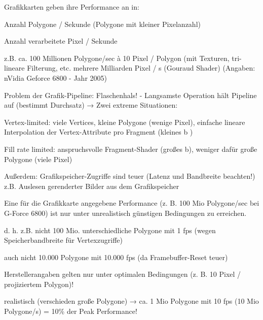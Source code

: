 \documentclass[landscape]{article}
\begin{document}
\begin{multicols}{3}
  \begin{itemize*}
    \item Grafikkarten geben ihre Performance an in:
          \begin{itemize*}
            \item  Anzahl Polygone / Sekunde (Polygone mit kleiner Pixelanzahl)
            \item Anzahl verarbeitete Pixel / Sekunde
            \item  z.B. ca. 100 Millionen Polygone/sec à 10 Pixel / Polygon (mit Texturen, tri-lineare Filterung, etc. mehrere Milliarden Pixel / s (Gouraud Shader) (Angaben: nVidia Geforce 6800 - Jahr 2005)
          \end{itemize*}
    \item Problem der Grafik-Pipeline: Flaschenhals! - Langsamste Operation hält Pipeline auf (bestimmt Durchsatz) → Zwei extreme Situationen:
          \begin{itemize*}
            \item  Vertex-limited: viele Vertices, kleine Polygone (wenige Pixel), einfache lineare Interpolation der Vertex-Attribute pro Fragment (kleines b )
            \item  Fill rate limited: anspruchsvolle Fragment-Shader (großes b), weniger dafür große Polygone (viele Pixel)
          \end{itemize*}
    \item Außerdem: Grafikspeicher-Zugriffe sind teuer (Latenz und Bandbreite beachten!) z.B. Auslesen gerenderter Bilder aus dem Grafikspeicher
    \item Eine für die Grafikkarte angegebene Performance (z. B. 100 Mio Polygone/sec bei G-Force 6800) ist nur unter unrealistisch günstigen Bedingungen zu erreichen.
          \begin{itemize*}
            \item  d. h. z.B. nicht 100 Mio. unterschiedliche Polygone mit 1 fps (wegen Speicherbandbreite für Vertexzugriffe)
            \item  auch nicht 10.000 Polygone mit 10.000 fps (da Framebuffer-Reset teuer)
            \item  Herstellerangaben gelten nur unter optimalen Bedingungen (z. B. 10 Pixel / projiziertem Polygon)!
            \item  realistisch (verschieden große Polygone) → ca. 1 Mio Polygone mit 10 fps (10 Mio Polygone/s) = 10\% der Peak Performance!
          \end{itemize*}
  \end{itemize*}
  

\end{multicols}
\end{document}
